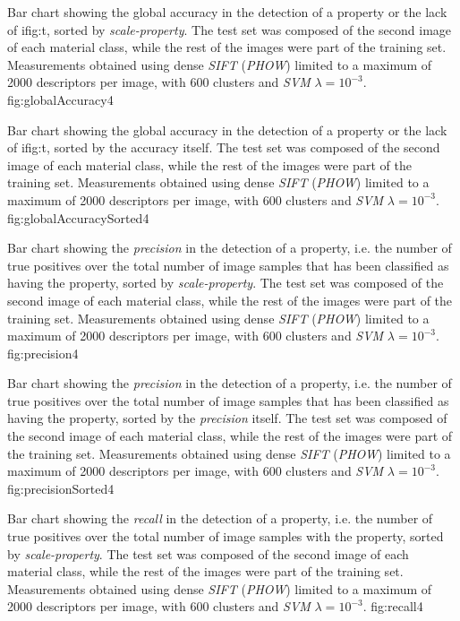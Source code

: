 {Bar chart showing the global accuracy in the detection of a property or the lack of ifig:t, sorted by \emph{scale-property}. The test set was composed of the second image of each material class, while the rest of the images were part of the training set. Measurements obtained using dense \emph{SIFT} (\emph{PHOW}) limited to a maximum of 2000 descriptors per image, with 600 clusters and \emph{SVM} $\lambda=10^{-3}$.}
{fig:globalAccuracy4}

{Bar chart showing the global accuracy in the detection of a property or the lack of ifig:t, sorted by the accuracy itself. The test set was composed of the second image of each material class, while the rest of the images were part of the training set. Measurements obtained using dense \emph{SIFT} (\emph{PHOW}) limited to a maximum of 2000 descriptors per image, with 600 clusters and \emph{SVM} $\lambda=10^{-3}$.}
{fig:globalAccuracySorted4}

{Bar chart showing the \emph{precision} in the detection of a property, i.e. the number of true positives over the total number of image samples that has been classified as having the property, sorted by \emph{scale-property}. The test set was composed of the second image of each material class, while the rest of the images were part of the training set. Measurements obtained using dense \emph{SIFT} (\emph{PHOW}) limited to a maximum of 2000 descriptors per image, with 600 clusters and \emph{SVM} $\lambda=10^{-3}$.}
{fig:precision4}

{Bar chart showing the \emph{precision} in the detection of a property, i.e. the number of true positives over the total number of image samples that has been classified as having the property, sorted by the \emph{precision} itself. The test set was composed of the second image of each material class, while the rest of the images were part of the training set. Measurements obtained using dense \emph{SIFT} (\emph{PHOW}) limited to a maximum of 2000 descriptors per image, with 600 clusters and \emph{SVM} $\lambda=10^{-3}$.}
{fig:precisionSorted4}

{Bar chart showing the \emph{recall} in the detection of a property, i.e. the number of true positives over the total number of image samples with the property, sorted by \emph{scale-property}. The test set was composed of the second image of each material class, while the rest of the images were part of the training set. Measurements obtained using dense \emph{SIFT} (\emph{PHOW}) limited to a maximum of 2000 descriptors per image, with 600 clusters and \emph{SVM} $\lambda=10^{-3}$.}
{fig:recall4}

